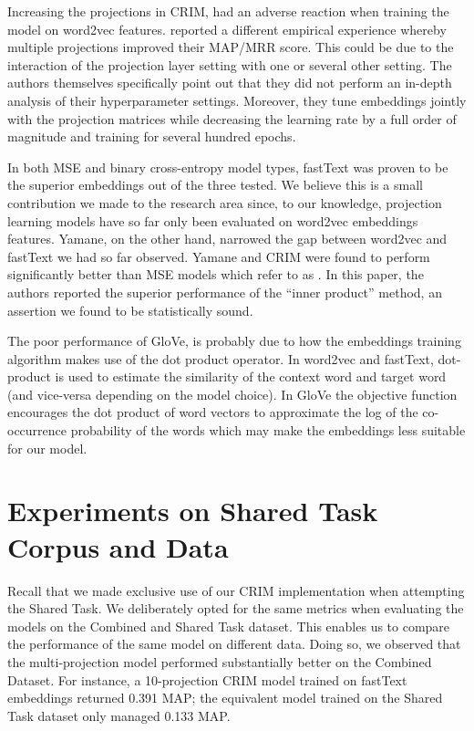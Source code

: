 Increasing the projections in CRIM, had an adverse reaction when training the model on word2vec features.  \citet{bernier2018crim} reported a different empirical experience whereby multiple projections improved their \ac{MAP}/\ac{MRR} score.  This could be due to the interaction of the projection layer setting with one or several other setting.  The authors themselves specifically point out that they did not perform an in-depth analysis of their hyperparameter settings.  Moreover, they tune embeddings jointly with the projection matrices while decreasing the learning rate by a full order of magnitude and training for several hundred epochs.  

In both \ac{MSE} and binary cross-entropy model types, fastText was proven to be the superior embeddings out of the three tested.  We believe this is a small contribution we made to the research area since, to our knowledge, projection learning models have so far only been evaluated on word2vec embeddings features.  Yamane, on the other hand, narrowed the gap between word2vec and fastText we had so far observed.  Yamane and CRIM were found to perform significantly better than \ac{MSE} models which \citet{yamane2016distributional} refer to as . In this paper, the authors reported the superior performance of the ``inner product'' method, an assertion we found to be statistically sound.

The poor performance of GloVe, is probably due to how the embeddings training algorithm makes use of the dot product operator.  In word2vec and fastText, dot-product is used to estimate the similarity of the context word and target word (and vice-versa depending on the model choice).  In GloVe the objective function encourages the dot product of word vectors to approximate the log of the co-occurrence probability of the words which may make the embeddings less suitable for our model.

\section{Experiments on Shared Task Corpus and Data}
Recall that we made exclusive use of our CRIM implementation when attempting the Shared Task.  We deliberately opted for the same metrics when evaluating the models on the Combined and Shared Task dataset.  This enables us to compare the performance of the same model on different data.  Doing so, we observed that the multi-projection model performed substantially better on the Combined Dataset.  For instance, a 10-projection CRIM model trained on fastText embeddings returned 0.391 \ac{MAP}; the equivalent model trained on the Shared Task dataset only managed 0.133 \ac{MAP}.

